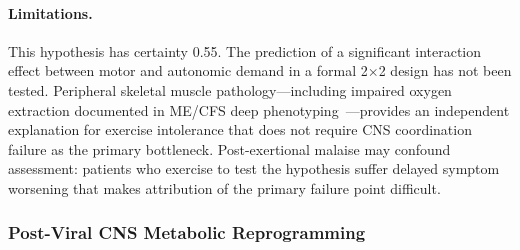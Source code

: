 \begin{hypothesis}
\paragraph{Limitations.}
This hypothesis has certainty 0.55. The prediction of a significant interaction effect between motor and autonomic demand in a formal 2$\times$2 design has not been tested. Peripheral skeletal muscle pathology---including impaired oxygen extraction documented in ME/CFS deep phenotyping~\cite{walitt2024deep}---provides an independent explanation for exercise intolerance that does not require CNS coordination failure as the primary bottleneck. Post-exertional malaise may confound assessment: patients who exercise to test the hypothesis suffer delayed symptom worsening that makes attribution of the primary failure point difficult.
\end{hypothesis}

\subsubsection{Post-Viral CNS Metabolic Reprogramming}

